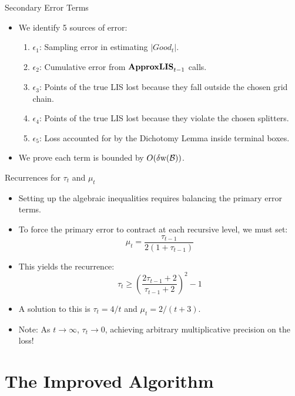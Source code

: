 \documentclass[11pt,aspectratio=169]{beamer}
\newcommand{\width}{{\bf {\rm  w}}}
\newcommand{\approxlis}{{\rm {\bf ApproxLIS}}}
\begin{document}
\begin{frame}{Secondary Error Terms}
    \begin{itemize}
        \item We identify 5 sources of error:
        \begin{enumerate}
            \item $\epsilon_1$: Sampling error in estimating $|Good_t|$.
            \item $\epsilon_2$: Cumulative error from $\approxlis_{t-1}$ calls.
            \item $\epsilon_3$: Points of the true LIS lost because they fall outside the chosen grid chain.
            \item $\epsilon_4$: Points of the true LIS lost because they violate the chosen splitters.
            \item $\epsilon_5$: Loss accounted for by the Dichotomy Lemma inside terminal boxes.
        \end{enumerate}
        \item We prove each term is bounded by $O(\delta \width(\mathcal{B}))$.
    \end{itemize}
\end{frame}

\begin{frame}{Recurrences for $\tau_t$ and $\mu_t$}
    \begin{itemize}
        \item Setting up the algebraic inequalities requires balancing the primary error terms.
        \item To force the primary error to contract at each recursive level, we must set:
        $$\mu_t = \frac{\tau_{t-1}}{2(1+\tau_{t-1})}$$
        \item This yields the recurrence:
        $$\tau_t \geq \left( \frac{2\tau_{t-1}+2}{\tau_{t-1}+2} \right)^2 - 1$$
        \item A solution to this is $\tau_t = 4/t$ and $\mu_t = 2/(t+3)$.
        \item Note: As $t \to \infty$, $\tau_t \to 0$, achieving arbitrary multiplicative precision on the loss!
    \end{itemize}
\end{frame}

\section{The Improved Algorithm}
\end{document}
